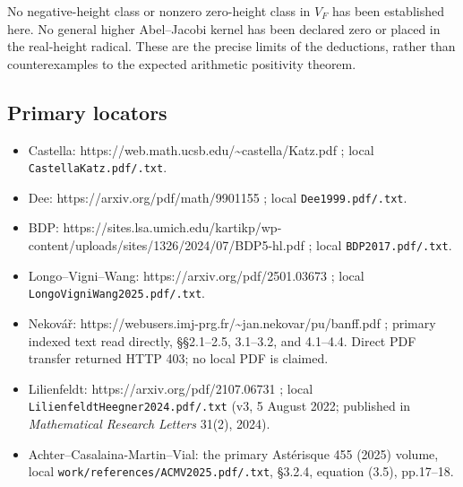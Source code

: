 No negative-height class or nonzero zero-height class in \(V_F\) has
been established here. No general higher Abel--Jacobi kernel has been
declared zero or placed in the real-height radical. These are the
precise limits of the deductions, rather than counterexamples to the
expected arithmetic positivity theorem.

\subsection{Primary locators}\label{primary-locators}

\begin{itemize}
\tightlist
\item
  Castella: https://web.math.ucsb.edu/\textasciitilde castella/Katz.pdf
  ; local \texttt{CastellaKatz.pdf/.txt}.
\item
  Dee: https://arxiv.org/pdf/math/9901155 ; local
  \texttt{Dee1999.pdf/.txt}.
\item
  BDP:
  https://sites.lsa.umich.edu/kartikp/wp-content/uploads/sites/1326/2024/07/BDP5-hl.pdf
  ; local \texttt{BDP2017.pdf/.txt}.
\item
  Longo--Vigni--Wang: https://arxiv.org/pdf/2501.03673 ; local
  \texttt{LongoVigniWang2025.pdf/.txt}.
\item
  Nekovář:
  https://webusers.imj-prg.fr/\textasciitilde jan.nekovar/pu/banff.pdf ;
  primary indexed text read directly, §§2.1--2.5, 3.1--3.2, and
  4.1--4.4. Direct PDF transfer returned HTTP 403; no local PDF is
  claimed.
\item
  Lilienfeldt: https://arxiv.org/pdf/2107.06731 ; local
  \texttt{LilienfeldtHeegner2024.pdf/.txt} (v3, 5 August 2022; published
  in \emph{Mathematical Research Letters} 31(2), 2024).
\item
  Achter--Casalaina-Martin--Vial: the primary Astérisque 455 (2025)
  volume, local \texttt{work/references/ACMV2025.pdf/.txt}, §3.2.4,
  equation (3.5), pp.17--18.
\end{itemize}
